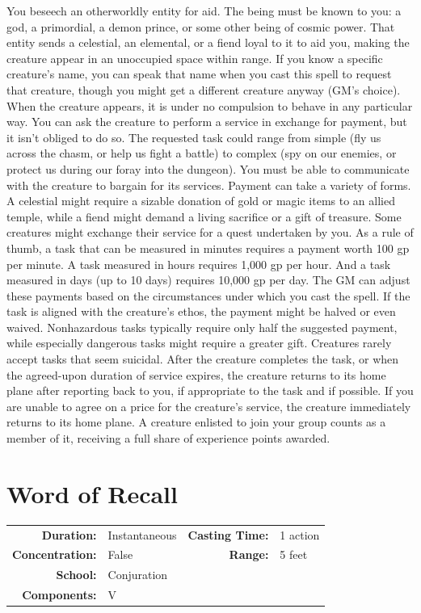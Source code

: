 \documentclass[12pt,showtrims]{memoir}
\begin{document}
\vspace{1\baselineskip}\noindent You beseech an otherworldly entity for aid. The being must be known to you: a god, a primordial, a demon prince, or some other being of cosmic power. That entity sends a celestial, an elemental, or a fiend loyal to it to aid you, making the creature appear in an unoccupied space within range. If you know a specific creature's name, you can speak that name when you cast this spell to request that creature, though you might get a different creature anyway (GM's choice). When the creature appears, it is under no compulsion to behave in any particular way. You can ask the creature to perform a service in exchange for payment, but it isn't obliged to do so. The requested task could range from simple (fly us across the chasm, or help us fight a battle) to complex (spy on our enemies, or protect us during our foray into the dungeon). You must be able to communicate with the creature to bargain for its services. Payment can take a variety of forms. A celestial might require a sizable donation of gold or magic items to an allied temple, while a fiend might demand a living sacrifice or a gift of treasure. Some creatures might exchange their service for a quest undertaken by you. As a rule of thumb, a task that can be measured in minutes requires a payment worth 100 gp per minute. A task measured in hours requires 1,000 gp per hour. And a task measured in days (up to 10 days) requires 10,000 gp per day. The GM can adjust these payments based on the circumstances under which you cast the spell. If the task is aligned with the creature's ethos, the payment might be halved or even waived. Nonhazardous tasks typically require only half the suggested payment, while especially dangerous tasks might require a greater gift. Creatures rarely accept tasks that seem suicidal. After the creature completes the task, or when the agreed-upon duration of service expires, the creature returns to its home plane after reporting back to you, if appropriate to the task and if possible. If you are unable to agree on a price for the creature's service, the creature immediately returns to its home plane. A creature enlisted to join your group counts as a member of it, receiving a full share of experience points awarded.

\newpage
\section*{Word of Recall}

{
\small\centering\vspace{-6pt}
\begin{tabular}{rlrl}
\toprule

\textbf{Duration:} & Instantaneous &
\textbf{Casting Time:} & 1 action \\
\textbf{Concentration:} & False &
\textbf{Range:} & 5 feet \\
\textbf{School:} & Conjuration \\
\textbf{Components:} & \multicolumn{3}{p{0.7\textwidth}}{V}\\

\bottomrule
\end{tabular}
}
\end{document}
